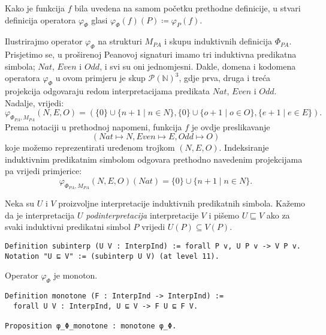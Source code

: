 \begin{remark}\label{remark:phi-phi-notation}
  Kako je funkcija \(f\) bila uvedena na samom početku prethodne definicije,
  u stvari definicija operatora \(\varphi_{\Phi}\) glasi
  \(
    \varphi_{\Phi}(f)(P) \coloneq \varphi_{P}(f)
  \).
\end{remark}

\begin{example}\label{ex:operator-phi-phi-PA}
  Ilustrirajmo operator \(\varphi_{\Phi}\) na strukturi \(M_{\mathit{PA}}\) i
  skupu induktivnih definicija \(\Phi_{\mathit{PA}}\).
  Prisjetimo se, u proširenoj Peanovoj signaturi imamo tri induktivna predikatna simbola;
  \(\mathit{Nat}\), \(\mathit{Even}\) i \(\mathit{Odd}\), i svi su oni jednomjesni.
  Dakle, domena i kodomena operatora \(\varphi_{\Phi}\) u ovom primjeru je skup \(\mathcal{P(\mathbb{N})}^{3}\),
  gdje prva, druga i treća projekcija odgovaraju redom interpretacijama predikata
  \(\mathit{Nat}\), \(\mathit{Even}\) i \(\mathit{Odd}\). Nadalje, vrijedi:
  \[
    \varphi_{\Phi_{\mathit{PA}}, M_{\mathit{PA}}}(N, E, O) =
    ( \{ 0 \} \cup \{ n + 1 \mid n \in N \},
    \{ 0 \} \cup \{ o + 1 \mid o \in O \},
    \{ e + 1 \mid e \in E \} ).
  \]
  \noindent Prema notaciji u prethodnoj napomeni,
  funkcija \(f\) je ovdje preslikavanje
  \[(\mathit{Nat} \mapsto \mathit{N}, \mathit{Even} \mapsto \mathit{E}, \mathit{Odd} \mapsto \mathit{O})\]
  koje možemo reprezentirati uređenom trojkom \((N, E, O)\).
  Indeksiranje induktivnim predikatnim simbolom odgovara prethodno
  navedenim projekcijama pa vrijedi primjerice:
  \[
    \varphi_{\Phi_{\mathit{PA}}, M_{\mathit{PA}}}(N, E, O)(\mathit{Nat}) = \{ 0 \} \cup \{ n + 1 \mid n \in N \}.
  \]
\end{example}

\begin{definition}
  Neka su \(U\) i \(V\) proizvoljne interpretacije induktivnih predikatnih simbola.
  Kažemo da je interpretacija \(U\) \textit{podinterpretacija} interpretacije \(V\)
  i pišemo \(U \sqsubseteq V\)
  ako za svaki induktivni predikatni simbol \(P\) vrijedi \(U(P) \subseteq V(P)\).
\begin{verbatim}
Definition subinterp (U V : InterpInd) := forall P v, U P v -> V P v.
Notation "U ⊑ V" := (subinterp U V) (at level 11).
\end{verbatim}
\end{definition}

\begin{proposition}
  Operator \(\varphi_{\Phi}\) je monoton.
\begin{verbatim}
Definition monotone (F : InterpInd -> InterpInd) :=
  forall U V : InterpInd, U ⊑ V -> F U ⊑ F V.
  
Proposition φ_Φ_monotone : monotone φ_Φ.
\end{verbatim}
\end{proposition}

